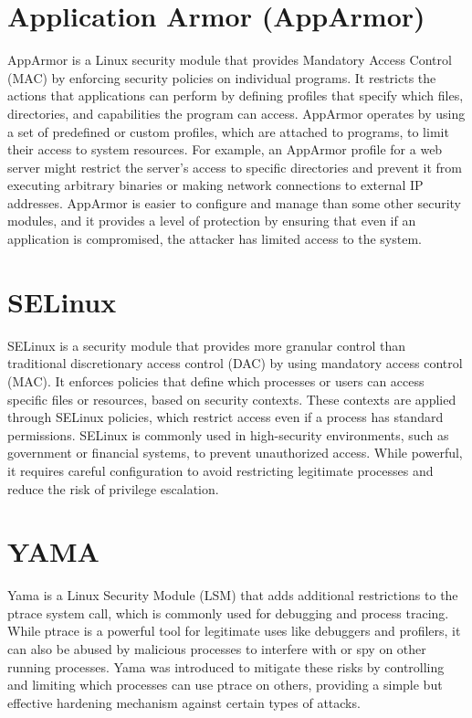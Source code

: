 \documentclass[12pt]{report}
\begin{document}
\begin{doublespace}
\section{Application Armor (AppArmor)}
AppArmor is a Linux security module that provides Mandatory Access Control (MAC) by enforcing security policies on individual programs. It restricts the actions that applications can perform by defining profiles that specify which files, directories, and capabilities the program can access. AppArmor operates by using a set of predefined or custom profiles, which are attached to programs, to limit their access to system resources. For example, an AppArmor profile for a web server might restrict the server’s access to specific directories and prevent it from executing arbitrary binaries or making network connections to external IP addresses. AppArmor is easier to configure and manage than some other security modules, and it provides a level of protection by ensuring that even if an application is compromised, the attacker has limited access to the system.

\section{SELinux}
SELinux is a security module that provides more granular control than traditional discretionary access control (DAC) by using mandatory access control (MAC). It enforces policies that define which processes or users can access specific files or resources, based on security contexts. These contexts are applied through SELinux policies, which restrict access even if a process has standard permissions. SELinux is commonly used in high-security environments, such as government or financial systems, to prevent unauthorized access. While powerful, it requires careful configuration to avoid restricting legitimate processes and reduce the risk of privilege escalation.













\section{YAMA}


Yama is a Linux Security Module (LSM) that adds additional restrictions to the ptrace system call, which is commonly used for debugging and process tracing. While ptrace is a powerful tool for legitimate uses like debuggers and profilers, it can also be abused by malicious processes to interfere with or spy on other running processes. Yama was introduced to mitigate these risks by controlling and limiting which processes can use ptrace on others, providing a simple but effective hardening mechanism against certain types of attacks.


\end{doublespace}
\end{document}
